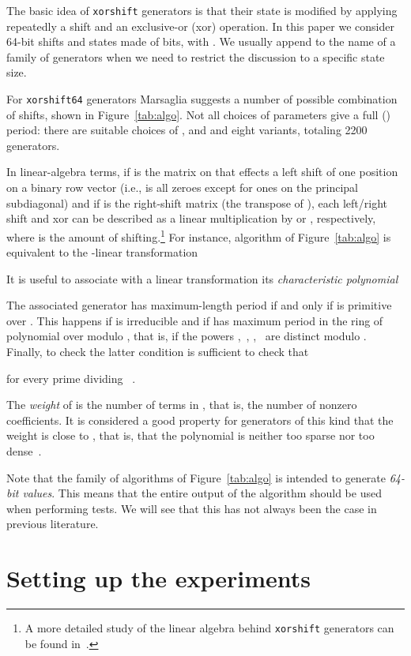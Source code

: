 \documentclass{acmsmalltr}
\newcommand{\xorshift}[1][]{\texttt{xorshift#1}\xspace}
\begin{document}
The basic idea of \xorshift generators is that their state is modified by
applying repeatedly a shift and an exclusive-or (xor) operation. In this paper we consider
64-bit shifts and states made of  bits, with . We usually append
 to the name of a family of generators when we need to restrict the discussion 
to a specific state size.

For \xorshift[64] generators Marsaglia suggests a number of possible combination of shifts,
shown in Figure~\ref{tab:algo}. Not all choices of parameters give a full ()
period: there are  suitable choices of ,  and  and eight variants,
totaling 2200 generators.
 
In linear-algebra terms, if  is the  matrix on  that effects a left shift of
one position on a binary row vector (i.e.,  is all zeroes except for ones on
the principal subdiagonal) and if  is the right-shift
matrix (the transpose of ), each left/right shift and xor can be described as
a linear multiplication by  or , respectively, where  is the
amount of shifting.\footnote{A more detailed study of the linear algebra behind \xorshift generators can be found in~\cite{MarXR,PaLXRNG}.} For instance, algorithm  of Figure~\ref{tab:algo} is equivalent to the
-linear transformation

It is useful to associate with a linear transformation  its \emph{characteristic polynomial}

The associated generator has maximum-length period if and only if  is primitive over . 
This happens if  is irreducible and if  has
maximum period in the ring of polynomial over  modulo , that is, if
the powers ,~, ,~ are distinct modulo . Finally,
to check the latter condition is sufficient to check that

for every prime  dividing ~\cite{LiNIFFA}. 

The \emph{weight} of  is the number
of terms in , that is, the number of nonzero coefficients. It is considered a good property for generators
of this kind that the weight is close to , that is, that the polynomial
is neither too sparse nor too dense~\cite{ComHCRBS}.


Note that the family of algorithms of Figure~\ref{tab:algo} is intended to
generate \emph{64-bit values}. This means that the entire output of the
algorithm should be used when performing tests. We will see that this has not
always been the case in previous literature.


\section{Setting up the experiments}
\label{sec:setup}
\end{document}
